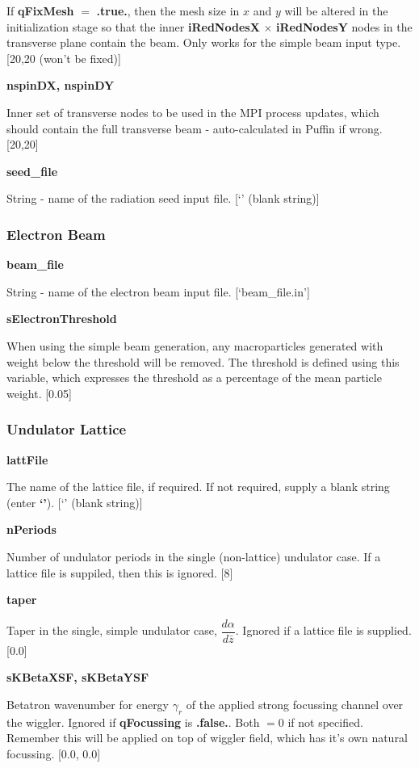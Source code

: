\documentclass[12pt]{article}%
\begin{document}
If {\bf qFixMesh} $=$ {\bf .true.}, then the mesh size in $x$ and $y$ will be altered in the initialization stage so that the inner {\bf iRedNodesX} $\times$ {\bf iRedNodesY} nodes in the transverse plane contain the beam. Only works for the simple beam input type. [20,20 (won't be fixed)]

{\bf nspinDX, nspinDY}

Inner set of transverse nodes to be used in the MPI process updates, which should contain the full transverse beam - auto-calculated in Puffin if wrong. [20,20]

{\bf seed\_file}

String - name of the radiation seed input file. [`' (blank string)]

\subsubsection{Electron Beam}


{\bf beam\_file}

String - name of the electron beam input file. [`beam\_file.in']

{\bf sElectronThreshold}

When using the simple beam generation, any macroparticles generated with weight below the threshold will be removed. The threshold is defined using this variable, which expresses the threshold as a percentage of the mean particle weight. [0.05]


\subsubsection{Undulator Lattice}

{\bf lattFile}

The name of the lattice file, if required. If not required, supply a blank string (enter {\bf `'}). [`' (blank string)]

{\bf nPeriods}

Number of undulator periods in the single (non-lattice) undulator case. If a lattice file is suppiled, then this is ignored. [8]

{\bf taper}

Taper in the single, simple undulator case, $\dfrac{d\alpha}{d \bar{z}}$. Ignored if a lattice file is supplied. [$0.0$]

{\bf sKBetaXSF, sKBetaYSF}

Betatron wavenumber for energy $\gamma_r$ of the applied strong focussing channel over the wiggler. Ignored if {\bf qFocussing} is {\bf .false.}. Both $=0$ if not specified. Remember this will be applied on top of wiggler field, which has it's own natural focussing. [0.0, 0.0]
\end{document}
